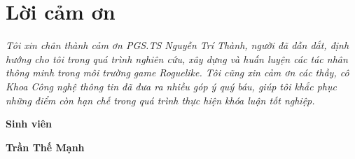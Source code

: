 \clearpage
{}

\chapter*{Lời cảm ơn}

\textit{Tôi xin chân thành cảm ơn PGS.TS Nguyễn Trí Thành, người đã dẫn dắt, định hướng cho tôi trong quá trình nghiên cứu, xây dựng và huấn luyện các tác nhân thông minh trong môi trường game Roguelike. Tôi cũng xin cảm ơn các thầy, cô Khoa Công nghệ thông tin đã đưa ra nhiều góp ý quý báu, giúp tôi khắc phục những điểm còn hạn chế trong quá trình thực hiện khóa luận tốt nghiệp.}


\vspace{1cm}

\hspace{9.4cm}\textbf{Sinh viên}


\hspace{8.85cm}\textbf{Trần Thế Mạnh}